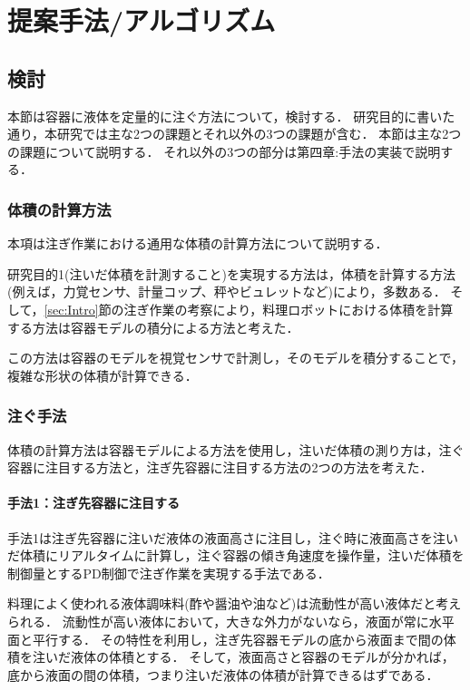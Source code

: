 \chapter{提案手法/アルゴリズム} \label{chp:2}
\section{検討}
本節は容器に液体を定量的に注ぐ方法について，検討する．
研究目的に書いた通り，本研究では主な2つの課題とそれ以外の3つの課題が含む．
本節は主な2つの課題について説明する．
それ以外の3つの部分は第四章:手法の実装で説明する．

	\subsection{体積の計算方法}
	本項は注ぎ作業における通用な体積の計算方法について説明する．
	
	研究目的1(注いだ体積を計測すること)を実現する方法は，体積を計算する方法(例えば，力覚センサ、計量コップ、秤やビュレットなど)により，多数ある．
	そして，\ref{sec:Intro}節の注ぎ作業の考察により，料理ロボットにおける体積を計算する方法は容器モデルの積分による方法と考えた．
	
	この方法は容器のモデルを視覚センサで計測し，そのモデルを積分することで，複雑な形状の体積が計算できる．
	
	\subsection{注ぐ手法}
	体積の計算方法は容器モデルによる方法を使用し，注いだ体積の測り方は，注ぐ容器に注目する方法と，注ぎ先容器に注目する方法の2つの方法を考えた．
	
		\subsubsection{手法1：注ぎ先容器に注目する}\label{sec:pour-method1}
		手法1は注ぎ先容器に注いだ液体の液面高さに注目し，注ぐ時に液面高さを注いだ体積にリアルタイムに計算し，注ぐ容器の傾き角速度を操作量，注いだ体積を制御量とするPD制御で注ぎ作業を実現する手法である．
		
		料理によく使われる液体調味料(酢や醤油や油など)は流動性が高い液体だと考えられる．
		流動性が高い液体において，大きな外力がないなら，液面が常に水平面と平行する．%
		その特性を利用し，注ぎ先容器モデルの底から液面まで間の体積を注いだ液体の体積とする．
		そして，液面高さと容器のモデルが分かれば，底から液面の間の体積，つまり注いだ液体の体積が計算できるはずである．
		
